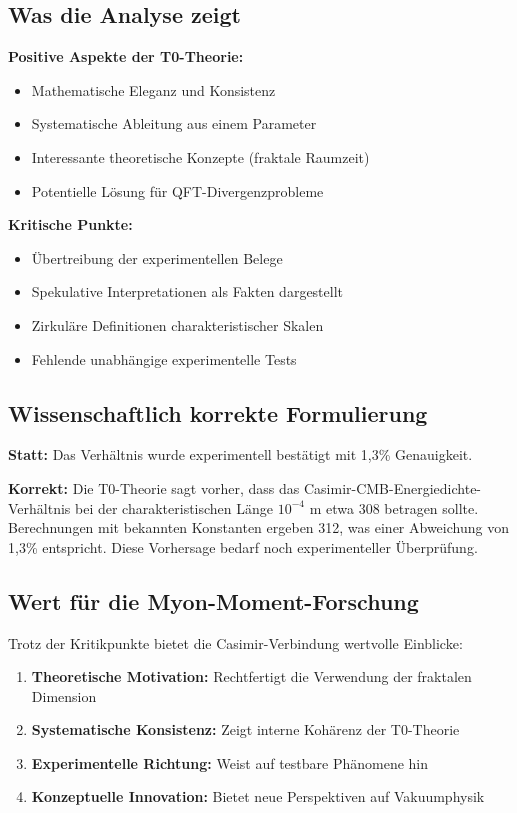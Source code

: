 \documentclass[12pt,a4paper]{article}
\begin{document}
	\begin{summary}
		\subsection{Was die Analyse zeigt}
		
		\textbf{Positive Aspekte der T0-Theorie:}
		\begin{itemize}
			\item Mathematische Eleganz und Konsistenz
			\item Systematische Ableitung aus einem Parameter
			\item Interessante theoretische Konzepte (fraktale Raumzeit)
			\item Potentielle L\"osung f\"ur QFT-Divergenzprobleme
		\end{itemize}
		
		\textbf{Kritische Punkte:}
		\begin{itemize}
			\item \"Ubertreibung der experimentellen Belege
			\item Spekulative Interpretationen als Fakten dargestellt
			\item Zirkul\"are Definitionen charakteristischer Skalen
			\item Fehlende unabh\"angige experimentelle Tests
		\end{itemize}
		
		\subsection{Wissenschaftlich korrekte Formulierung}
		
		\textbf{Statt:} Das Verh\"altnis wurde experimentell best\"atigt mit 1{,}3\% Genauigkeit.
		
		\textbf{Korrekt:} Die T0-Theorie sagt vorher, dass das Casimir-CMB-Energiedichte-Verh\"altnis bei der charakteristischen L\"ange $10^{-4}$ m etwa 308 betragen sollte. Berechnungen mit bekannten Konstanten ergeben 312, was einer Abweichung von 1{,}3\% entspricht. Diese Vorhersage bedarf noch experimenteller \"Uberpr\"ufung.
		
		\subsection{Wert f\"ur die Myon-Moment-Forschung}
		
		Trotz der Kritikpunkte bietet die Casimir-Verbindung wertvolle Einblicke:
		\begin{enumerate}
			\item \textbf{Theoretische Motivation:} Rechtfertigt die Verwendung der fraktalen Dimension
			\item \textbf{Systematische Konsistenz:} Zeigt interne Koh\"arenz der T0-Theorie
			\item \textbf{Experimentelle Richtung:} Weist auf testbare Ph\"anomene hin
			\item \textbf{Konzeptuelle Innovation:} Bietet neue Perspektiven auf Vakuumphysik
		\end{enumerate}
		

\end{summary}
\end{document}
